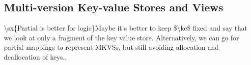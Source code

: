 \subsection{Multi-version Key-value Stores and Views}
\label{sec:mkvs-view}





\ac{\sx{Partial is better for logic}Maybe it's better to keep $\ke$ fixed and say that we look at only a 
fragment of the key value store. Alternatively, we can go for partial mappings to 
represent MKVSs, but still avoiding allocation and deallocation of keys.}.





